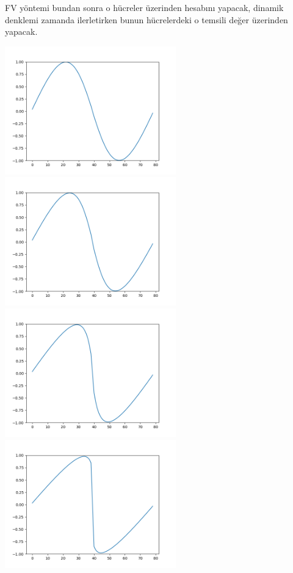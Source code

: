 \documentclass[12pt,fleqn]{article}\usepackage{../../common}
\begin{document}
FV yöntemi bundan sonra o hücreler üzerinden hesabını yapacak, dinamik denklemi
zamanda ilerletirken bunun hücrelerdeki o temsili değer üzerinden yapacak.


\includegraphics[width=20em]{out-005.png}
\includegraphics[width=20em]{out-010.png}
\includegraphics[width=20em]{out-020.png}
\includegraphics[width=20em]{out-030.png}
\end{document}
